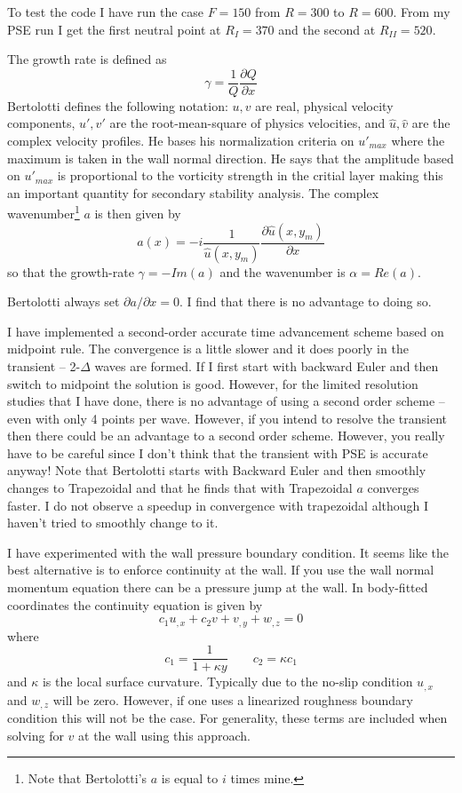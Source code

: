 \documentclass[12pt]{article}
\begin{document}
To test the code I have run the case $F=150$ from $R=300$ to $R=600$.  From my
PSE run I get the first neutral point at $R_I=370$ and the second at $R_{II} =
520$.

The growth rate is defined as
%
\begin{equation}
  \gamma = \frac{1}{Q}\frac{\partial Q}{\partial x}
\end{equation}
%
Bertolotti defines the following notation: $u,v$ are real, physical velocity
components, $u',v'$ are the root-mean-square of physics velocities, and $\hat
u,\hat v$ are the complex velocity profiles.  He bases his normalization
criteria on $u'_{max}$ where the maximum is taken in the wall normal
direction.  He says that the amplitude based on $u'_{max}$ is proportional to
the vorticity strength in the critial layer making this an important quantity
for secondary stability analysis.  The complex wavenumber\footnote{Note that
Bertolotti's $a$ is equal to $i$ times mine.} $a$ is then given by
%
\begin{equation}
  a(x) = -i \frac{1}{\hat u(x,y_m)} \frac{\partial\hat u(x,y_m)} {\partial x}
\end{equation}
%
so that the growth-rate $\gamma = -Im(a)$ and the wavenumber is $\alpha =
Re(a)$.

Bertolotti always set $\partial a/\partial x = 0$.  I find that there is no
advantage to doing so.

I have implemented a second-order accurate time advancement scheme based on
midpoint rule.  The convergence is a little slower and it does poorly in the
transient -- 2-$\Delta$ waves are formed.  If I first start with backward
Euler and then switch to midpoint the solution is good.  However, for the
limited resolution studies that I have done, there is no advantage of using a
second order scheme -- even with only 4 points per wave.  However, if you
intend to resolve the transient then there could be an advantage to a second
order scheme.  However, you really have to be careful since I don't think that
the transient with PSE is accurate anyway!  Note that Bertolotti starts with
Backward Euler and then smoothly changes to Trapezoidal and that he finds that
with Trapezoidal $a$ converges faster.  I do not observe a speedup in
convergence with trapezoidal although I haven't tried to smoothly change to
it.

I have experimented with the wall pressure boundary condition.  It seems like
the best alternative is to enforce continuity at the wall.  If you use the
wall normal momentum equation there can be a pressure jump at the wall.  In
body-fitted coordinates the continuity equation is given by
%
\begin{equation}
  c_1 u_{,x} + c_2 v + v_{,y} + w_{,z} = 0
\end{equation}
%
where
%
\begin{equation}
  c_1 = \frac{1}{1 + \kappa y} \qquad c_2 = \kappa c_1
\end{equation}
%
and $\kappa$ is the local surface curvature.  Typically due to the no-slip
condition $u_{,x}$ and $w_{,z}$ will be zero.  However, if one uses a
linearized roughness boundary condition this will not be the case.  For
generality, these terms are included when solving for $v$ at the wall using
this approach.
\end{document}
